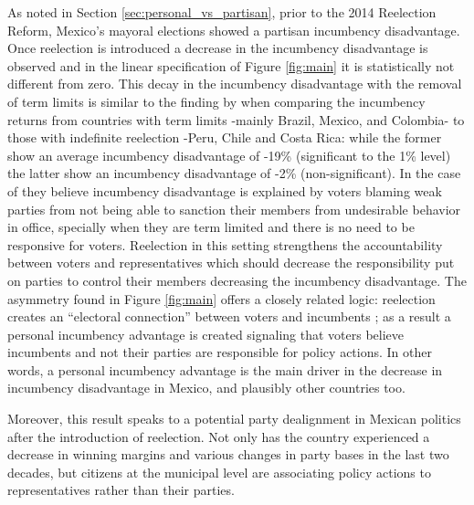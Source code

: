 \documentclass[12pt]{amsart}
\numberwithin{equation}{section}
\theoremstyle{definition}
\theoremstyle{definition}
\theoremstyle{definition}
\begin{document}
As noted in Section \ref{sec:personal_vs_partisan}, prior to the 2014 Reelection Reform, Mexico's mayoral elections showed a partisan incumbency disadvantage. Once reelection is introduced a decrease in the incumbency disadvantage is observed and in the linear specification of Figure \ref{fig:main} it is statistically not different from zero. This decay in the incumbency disadvantage with the removal of term limits is similar to the finding by \citet{klasnja_titiunik_2017} when comparing the incumbency returns from countries with term limits -mainly Brazil, Mexico, and Colombia-  to those with indefinite reelection -Peru, Chile and Costa Rica: while the former show an average incumbency disadvantage of -19\% (significant to the 1\% level) the latter show an incumbency disadvantage of -2\% (non-significant). In the case of \citet{klasnja_titiunik_2017} they believe incumbency disadvantage is explained by voters blaming weak parties from not being able to sanction their members from undesirable behavior in office, specially when they are term limited and there is no need to be responsive for voters. Reelection in this setting strengthens the accountability between voters and representatives which should decrease the responsibility put on parties to control their members decreasing the incumbency disadvantage. The asymmetry found in Figure \ref{fig:main} offers a closely related logic: reelection creates an ``electoral connection'' between voters and incumbents \citep{mayhew_1974}; as a result a personal incumbency advantage is created signaling that voters believe incumbents and not their parties are responsible for policy actions. %
 In other words, a personal incumbency advantage is the main driver in the decrease in incumbency disadvantage in Mexico, and plausibly other countries too.

Moreover, this result speaks to a potential party dealignment in Mexican politics after the introduction of reelection. Not only has the country experienced a decrease in winning margins and various changes in party bases in the last two decades, but citizens at the municipal level are associating policy actions to representatives rather than their parties. 
       
\end{document}
